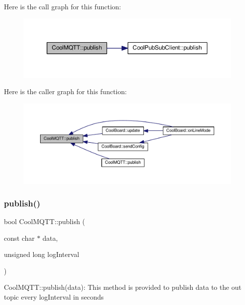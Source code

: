 Here is the call graph for this function\+:
\nopagebreak
\begin{figure}[H]
\begin{center}
\leavevmode
\includegraphics[width=350pt]{class_cool_m_q_t_t_ace977b3e90ab14b1199fe5c4fb0a13ec_cgraph}
\end{center}
\end{figure}
Here is the caller graph for this function\+:
\nopagebreak
\begin{figure}[H]
\begin{center}
\leavevmode
\includegraphics[width=350pt]{class_cool_m_q_t_t_ace977b3e90ab14b1199fe5c4fb0a13ec_icgraph}
\end{center}
\end{figure}
\mbox{\label{class_cool_m_q_t_t_a613c5e3927ae85bb94fbf648d84d8780}} 
\subsubsection{\texorpdfstring{publish()}{publish()}\hspace{0.1cm}{\footnotesize\ttfamily [2/2]}}
{\footnotesize\ttfamily bool Cool\+M\+Q\+T\+T\+::publish (\begin{DoxyParamCaption}\item[{const char $\ast$}]{data,  }\item[{unsigned long}]{log\+Interval }\end{DoxyParamCaption})}

Cool\+M\+Q\+T\+T\+::publish(data)\+: This method is provided to publish data to the out topic every log\+Interval in seconds

